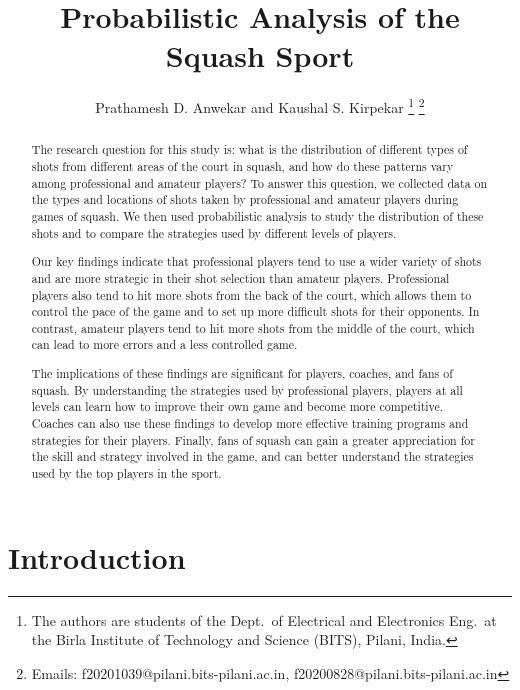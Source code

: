 \documentclass[10pt,conference]{IEEEtran}
\begin{document}
\title{Probabilistic Analysis of the Squash Sport}
%
\author{Prathamesh D. Anwekar and Kaushal S. Kirpekar
\thanks{The authors are students of the Dept.\ of Electrical and Electronics
     Eng.\ at the Birla Institute of Technology and Science (BITS), Pilani,
     India.}
%
\thanks{Emails: f20201039@pilani.bits-pilani.ac.in,
     f20200828@pilani.bits-pilani.ac.in}
}

\IEEEaftertitletext{\vspace{-0.5\baselineskip}}

\maketitle
\newcommand{\ceil}[1]{\lceil{#1}\rceil}


\begin{abstract}
The research question for this study is: what is the distribution of different types of shots from different areas of the court in squash, and how do these patterns vary among professional and amateur players? To answer this question, we collected data on the types and locations of shots taken by professional and amateur players during games of squash. We then used probabilistic analysis to study the distribution of these shots and to compare the strategies used by different levels of players.

Our key findings indicate that professional players tend to use a wider variety of shots and are more strategic in their shot selection than amateur players. Professional players also tend to hit more shots from the back of the court, which allows them to control the pace of the game and to set up more difficult shots for their opponents. In contrast, amateur players tend to hit more shots from the middle of the court, which can lead to more errors and a less controlled game.

The implications of these findings are significant for players, coaches, and fans of squash. By understanding the strategies used by professional players, players at all levels can learn how to improve their own game and become more competitive. Coaches can also use these findings to develop more effective training programs and strategies for their players. Finally, fans of squash can gain a greater appreciation for the skill and strategy involved in the game, and can better understand the strategies used by the top players in the sport.
\end{abstract}

\section{Introduction}
\label{sec:intro}
\end{document}
